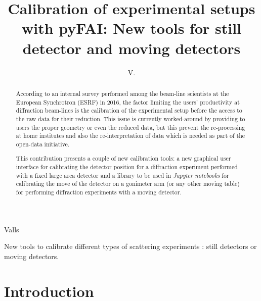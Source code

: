 \documentclass[preprint, pdf]{iucr}              %
\begin{document}

\title{Calibration of experimental setups with {pyFAI}: New tools for still
detector and moving detectors}

 \author[a]{V.}{Valls}
 
 





\maketitle                        %

\begin{synopsis}
New tools to calibrate different types of scattering experiments : still
detectors or moving detectors.
\end{synopsis}

\begin{abstract}

According to an internal survey performed among the beam-line scientists at
the European Synchrotron (ESRF) in 2016, the factor limiting the users'
productivity at diffraction beam-lines is the calibration of the experimental
setup before the access to the raw data for their reduction. 
This issue is currently worked-around by providing to users the proper
geometry or even the reduced data, but this prevent the
re-processing at home institutes and also the re-interpretation of data which
is needed as part of the open-data initiative.

This contribution presents a couple of new calibration tools: 
a new graphical user interface for calibrating the detector position for a 
diffraction experiment performed with a fixed large area detector and a library
to be used in \textit{Jupyter notebooks} for calibrating the move of the
detector on a gonimeter arm (or any other moving table) for performing
diffraction experiments with a moving detector.
\end{abstract}


\section{Introduction}
\end{document}
